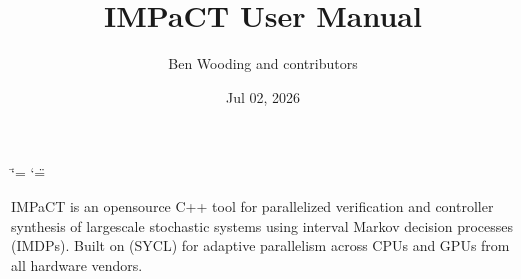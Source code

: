 \documentclass[a4paper,10pt,english]{sphinxmanual}
\title{IMPaCT User Manual}
\date{Jul 02, 2026}
\author{Ben Wooding and contributors}
\begin{document}
\ifdefined\shorthandoff
  \ifnum\catcode`\=\string=\active\shorthandoff{=}\fi
  \ifnum\catcode`\"=\active{}\fi
\fi

\pagestyle{empty}
\sphinxmaketitle
\pagestyle{plain}
\sphinxtableofcontents
\pagestyle{normal}
\label{\detokenize{index::doc}}


\sphinxAtStartPar
{}

\sphinxAtStartPar
IMPaCT is an open\sphinxhyphen{}source C++ tool for parallelized verification and controller synthesis
of large\sphinxhyphen{}scale stochastic systems using interval Markov decision processes (IMDPs).
Built on  (SYCL) for
adaptive parallelism across CPUs and GPUs from all hardware vendors.
\end{document}
